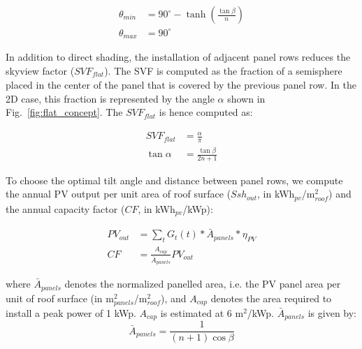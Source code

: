 \begin{equation}
\begin{aligned}
\label{eq:flat_theta}
    \theta_{min} & = 90^\circ - \tanh(\tfrac{\tan{\beta}}{n} ) \\
    \theta_{max} & = 90^\circ
\end{aligned}
\end{equation}

In addition to direct shading, the installation of adjacent panel rows reduces the skyview factor ($\mathit{SVF}_{\mathit{flat}}$). The SVF is computed as the fraction of a semisphere placed in the center of the panel that is covered by the previous panel row. In the 2D case, this fraction is represented by the angle $\alpha$ shown in Fig.~\ref{fig:flat_concept}. The $\mathit{SVF}_{\mathit{flat}}$ is hence computed as:

\begin{equation}
\begin{aligned}
\label{eq:flat_svf}
    \mathit{SVF}_{\mathit{flat}} & = \frac{\alpha}{\pi} \\
    \tan{\alpha} & = \frac{\tan{\beta}}{2 n + 1}
\end{aligned}
\end{equation}

To choose the optimal tilt angle and distance between panel rows, we compute the annual PV output per unit area of roof surface ($\mathit{Ssh}_{\mathit{out}}$, in kWh$_{\mathit{pv}}$/m$^2_{\mathit{roof}}$) and the annual capacity factor ($\mathit{CF}$, in kWh$_{\mathit{pv}}$/kWp):

\begin{equation}
\begin{aligned}
\label{eq:flat_pv}
    \mathit{PV}_{\mathit{out}} &= \sum_t G_t(t) * \bar{A}_{\mathit{panels}} * \eta_{PV} \\
    \mathit{CF} &= \frac{A_{\mathit{cap}}}{\bar{A}_{\mathit{panels}}} \mathit{PV}_{\mathit{out}}
\end{aligned}
\end{equation}

where $\bar{A}_{\mathit{panels}}$ denotes the normalized panelled area, i.e. the PV panel area per unit of roof surface (in m$^2_{\mathit{panels}}$/m$^2_{\mathit{roof}}$), and $A_{\mathit{cap}}$ denotes the area required to install a peak power of 1 kWp. $A_{\mathit{cap}}$ is estimated at 6 m$^2$/kWp. $\bar{A}_{\mathit{panels}}$ is given by:
\begin{equation}
\label{eq:flat_n_norm}
    \bar{A}_{\mathit{panels}} = \frac{1}{(n+1) \cos{\beta}}
\end{equation}

